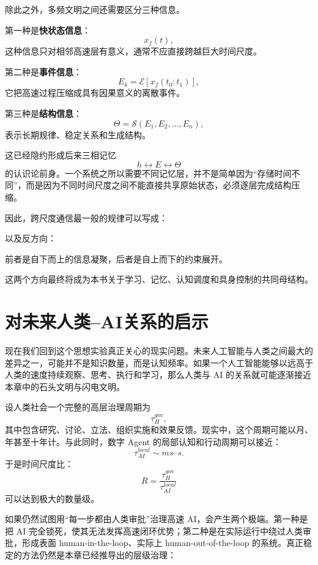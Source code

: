 除此之外，多频文明之间还需要区分三种信息。

第一种是\textbf{快状态信息}：
\[
x_f(t),
\]
这种信息只对相邻高速层有意义，通常不应直接跨越巨大时间尺度。

第二种是\textbf{事件信息}：
\[
E_k
=
\mathcal E[x_f(t_0:t_1)],
\]
它把高速过程压缩成具有因果意义的离散事件。

第三种是\textbf{结构信息}：
\[
\Theta
=
\mathcal S(E_1,E_2,\ldots,E_n),
\]
表示长期规律、稳定关系和生成结构。

这已经隐约形成后来三相记忆
\[
h\leftrightarrow E\leftrightarrow\Theta
\]
的认识论前身。一个系统之所以需要不同记忆层，并不是简单因为“存储时间不同”，而是因为不同时间尺度之间不能直接共享原始状态，必须逐层完成结构压缩。

因此，跨尺度通信最一般的规律可以写成：
\begin{statementbox}
\centering
{}
\end{statementbox}
以及反方向：
\begin{statementbox}
\centering
{}
\end{statementbox}

前者是自下而上的信息凝聚，后者是自上而下的约束展开。

这两个方向最终将成为本书关于学习、记忆、认知调度和具身控制的共同母结构。


\section{对未来人类--AI关系的启示}

现在我们回到这个思想实验真正关心的现实问题。未来人工智能与人类之间最大的差异之一，可能并不是知识数量，而是认知频率。如果一个人工智能能够以远高于人类的速度持续观察、思考、执行和学习，那么人类与 AI 的关系就可能逐渐接近本章中的石头文明与闪电文明。

设人类社会一个完整的高层治理周期为
\[
\tau_H^{gov},
\]
其中包含研究、讨论、立法、组织实施和效果反馈。现实中，这个周期可能以月、年甚至十年计。与此同时，数字 Agent 的局部认知和行动周期可以接近：
\[
\tau_{AI}^{local}\sim ms\text{--}s.
\]
于是时间尺度比：
\[
R=
\frac{\tau_H^{gov}}
{\tau_{AI}^{local}}
\]
可以达到极大的数量级。

如果仍然试图用“每一步都由人类审批”治理高速 AI，会产生两个极端。第一种是把 AI 完全锁死，使其无法发挥高速闭环优势；第二种是在实际运行中绕过人类审批，形成表面 human-in-the-loop、实际上 human-out-of-the-loop 的系统。真正稳定的方法仍然是本章已经推导出的层级治理：
\begin{statementbox}
\centering
{}
\end{statementbox}

